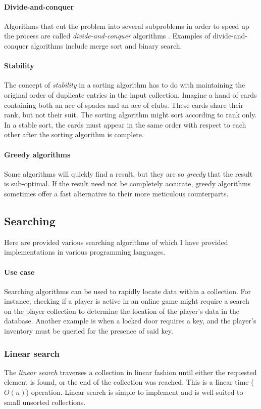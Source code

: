 \documentclass{article}
\begin{document}
\paragraph{Divide-and-conquer}
Algorithms that cut the problem into several subproblems in order to speed up the process are called {\em divide-and-conquer}
algorithms \cite[p.30-38]{introduction-to-algorithms}. Examples of divide-and-conquer algorithms include merge sort and binary
search.

\paragraph{Stability}
The concept of {\em stability} in a sorting algorithm has to do with maintaining the original order of duplicate entries in the
input collection. Imagine a hand of cards containing both an ace of spades and an ace of clubs. These cards share their rank,
but not their suit. The sorting algorithm might sort according to rank only. In a stable sort, the cards must appear in the same
order with respect to each other after the sorting algorithm is complete.

\paragraph{Greedy algorithms}
Some algorithms will quickly find a result, but they are so {\em greedy} that the result is sub-optimal. If the result need
not be completely accurate, greedy algorithms sometimes offer a fast alternative to their more meticulous counterparts.


\subsection{Searching}
Here are provided various searching algorithms of which I have provided implementations in various programming languages.

\paragraph{Use case}
Searching algorithms can be used to rapidly locate data within a collection. For instance, checking if a player is active in
an online game might require a search on the player collection to determine the location of the player's data in the database.
Another example is when a locked door requires a key, and the player's inventory must be queried for the presence of said key.

\subsubsection{Linear search}
The {\em linear search} traverses a collection in linear fashion until either the requested element is found,
or the end of the collection was reached. This is a linear time (\(O(n)\)) operation.
Linear search is simple to implement and is well-suited to small unsorted collections.
\end{document}
